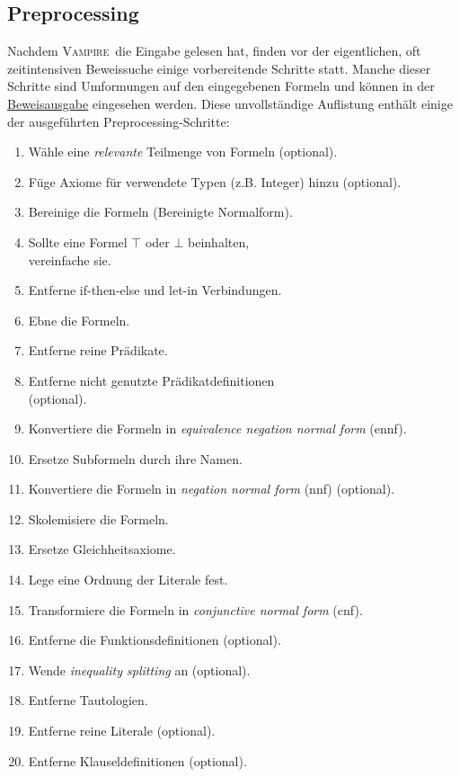 \documentclass{article}
\newcommand{\vampire}{\textsc{Vampire}~}
\begin{document}
\subsection{Preprocessing}
\label{subsec:preprocessing}

Nachdem \vampire die Eingabe gelesen hat, finden vor der eigentlichen, oft zeitintensiven
Beweissuche einige vorbereitende Schritte statt. Manche dieser Schritte sind Umformungen
auf den eingegebenen Formeln und können in der \hyperref[sec:output]{Beweisausgabe} eingesehen werden.
Diese unvollständige Auflistung enthält einige der ausgeführten Preprocessing-Schritte:

\begin{enumerate}
	\itemsep-0.3em 
	\item Wähle eine \textit{relevante} Teilmenge von Formeln (optional).
	\item Füge Axiome für verwendete Typen (z.B. Integer) hinzu (optional).
	\item Bereinige die Formeln (Bereinigte Normalform).
	\item Sollte eine Formel $\top$ oder $\bot$ beinhalten, \\vereinfache sie.
	\item Entferne if-then-else und let-in Verbindungen.
	\item Ebne die Formeln.
	\item Entferne reine Prädikate.
	\item Entferne nicht genutzte Prädikatdefinitionen \\(optional).
	\item Konvertiere die Formeln in \textit{equivalence negation normal form} (ennf).
	\item Ersetze Subformeln durch ihre Namen.
	\item Konvertiere die Formeln in \textit{negation normal form} (nnf) (optional).
	\item Skolemisiere die Formeln.
	\item Ersetze Gleichheitsaxiome.
	\item Lege eine Ordnung der Literale fest.
	\item Transformiere die Formeln in \textit{conjunctive normal form} (cnf).
	\item Entferne die Funktionsdefinitionen (optional).
	\item Wende \textit{inequality splitting} an (optional).
	\item Entferne Tautologien.
	\item Entferne reine Literale (optional).
	\item Entferne Klauseldefinitionen (optional).
\end{enumerate}
\end{document}
